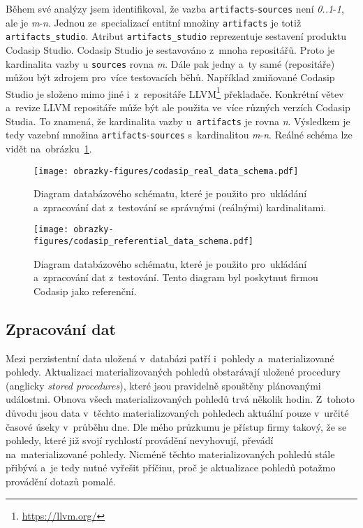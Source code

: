 Během své analýzy jsem identifikoval, že vazba \texttt{artifacts}-\texttt{sources} není \textit{0..1}-\textit{1}, ale je \textit{m}-\textit{n}. Jednou ze~specializací entitní množiny \texttt{artifacts} je totiž  \texttt{artifacts\_studio}.
Atribut \texttt{artifacts\_studio} reprezentuje sestavení produktu Codasip Studio\textsuperscript{\texttrademark}.  Codasip Studio\textsuperscript{\texttrademark} je sestavováno z~mnoha repositářů. Proto je kardinalita vazby u \texttt{sources} rovna \textit{m}.
Dále pak jedny a~ty samé  (repositáře) můžou být zdrojem pro~více testovacích běhů. Například zmiňované Codasip Studio\textsuperscript{\texttrademark} je složeno mimo jiné i~z~repositáře LLVM\footnote{\href{https://llvm.org/}{https://llvm.org/}} překladače. Konkrétní větev a~revize LLVM repositáře může být ale použita ve~více různých verzích Codasip Studia\textsuperscript{\texttrademark}. To znamená, že kardinalita vazby u~\texttt{artifacts} je rovna \textit{n}. Výsledkem je tedy vazební množina \texttt{artifacts}-\texttt{sources} s~kardinalitou \textit{m}-\textit{n}. Reálné schéma lze vidět
na~obrázku~\ref{img:codasip_real_data_schema}.
\begin{figure}[H]
	\centering
	\texttt{[image: obrazky-figures/codasip\_real\_data\_schema.pdf]}
	\caption{Diagram databázového schématu{,} které je použito pro~ukládání a~zpracování dat z~testování se správnými (reálnými) kardinalitami.}
	\label{img:codasip_real_data_schema}
\end{figure}
\begin{figure}[H]
	\centering
	\texttt{[image: obrazky-figures/codasip\_referential\_data\_schema.pdf]}
	\caption{Diagram databázového schématu{,} které je použito pro~ukládání a~zpracování dat z~testování. Tento diagram byl poskytnut firmou Codasip jako referenční.}
	\label{img:codasip_referential_data_schema}
\end{figure}


\subsection{Zpracování dat}
\label{subsection:zpracovani_dat_v_databazi}
Mezi perzistentní data uložená v~databázi patří i~pohledy a~materializované pohledy. Aktualizaci materializovaných
pohledů obstarávají uložené procedury (anglicky \textit{stored procedures}), které jsou pravidelně spouštěny
plánovanými událostmi. Obnova všech materializovaných pohledů trvá několik hodin. Z~tohoto důvodu jsou data v~těchto
materializovaných pohledech aktuální pouze v~určité časové úseky v~průběhu dne.
Dle mého průzkumu je přístup firmy takový, že se pohledy, které již svojí rychlostí provádění nevyhovují, převádí
na~materializované pohledy. Nicméně těchto materializovaných pohledů stále přibývá a~je tedy nutné vyřešit příčinu, proč je aktualizace pohledů potažmo provádění dotazů pomalé.

